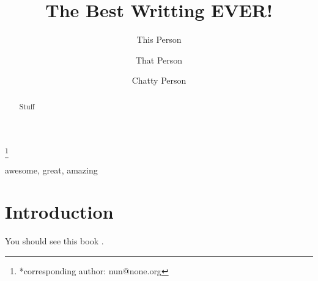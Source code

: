 \documentclass{preprint}
\begin{document}
\title{The Best Writting EVER!}

\author{This Person}
\author{That Person}
\author{Chatty Person}\thanks{*corresponding author: nun@none.org}


\maketitle

\begin{abstract}
Stuff
\end{abstract}

\begin{keywords}
awesome, great, amazing
\end{keywords}

\section{Introduction}

You should see this book \cite{greatbook}.



\end{document}
